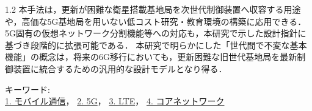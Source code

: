 \begin{spacing}{1.2}
本手法は，更新が困難な衛星搭載基地局を次世代制御装置へ収容する用途や，高価な5G基地局を用いない低コスト研究・教育環境の構築に応用できる．
5G固有の仮想ネットワーク分割機能等への対応も，本研究で示した設計指針に基づき段階的に拡張可能である．
本研究で明らかにした「世代間で不変な基本機能」の概念は，将来の6G移行においても，更新困難な旧世代基地局を最新制御装置に統合するための汎用的な設計モデルとなり得る．

\end{spacing}

\noindent キーワード:\\
\underline{1. モバイル通信}，
\underline{2. 5G}，
\underline{3. LTE}，
\underline{4. コアネットワーク}
\begin{flushright}
\dept \\
\author
\end{flushright}
